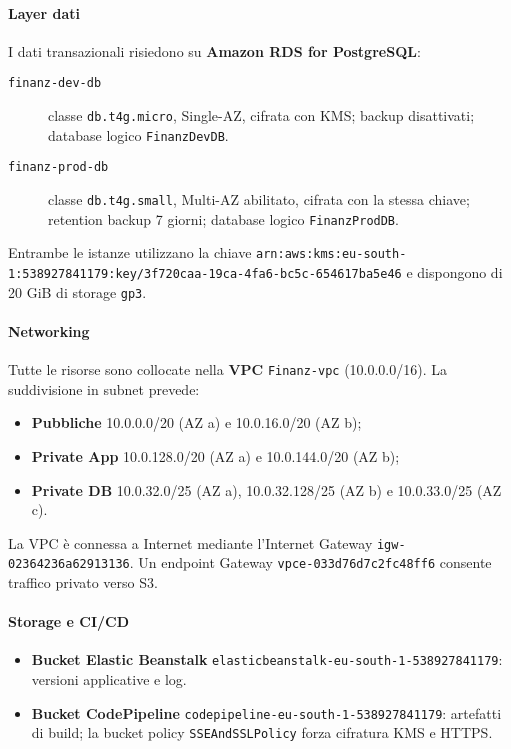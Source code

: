 \paragraph{Layer dati}
I dati transazionali risiedono su \textbf{Amazon RDS for PostgreSQL}:
\begin{description}
  \item[\texttt{finanz-dev-db}] classe \texttt{db.t4g.micro}, Single-AZ, cifrata con KMS; backup disattivati; database logico \texttt{FinanzDevDB}.
  \item[\texttt{finanz-prod-db}] classe \texttt{db.t4g.small}, Multi-AZ abilitato, cifrata con la stessa chiave; retention backup 7 giorni; database logico \texttt{FinanzProdDB}.
\end{description}
Entrambe le istanze utilizzano la chiave  
\texttt{arn:aws:kms:eu-south-1:538927841179:key/3f720caa-19ca-4fa6-bc5c-654617ba5e46}  
e dispongono di 20 GiB di storage \texttt{gp3}.

\paragraph{Networking}
Tutte le risorse sono collocate nella \textbf{VPC} \texttt{Finanz-vpc} (10.0.0.0/16). La suddivisione in subnet prevede:  
\begin{itemize}
  \item \textbf{Pubbliche} 10.0.0.0/20 (AZ a) e 10.0.16.0/20 (AZ b);
  \item \textbf{Private App} 10.0.128.0/20 (AZ a) e 10.0.144.0/20 (AZ b);
  \item \textbf{Private DB} 10.0.32.0/25 (AZ a), 10.0.32.128/25 (AZ b) e 10.0.33.0/25 (AZ c).
\end{itemize}
La VPC è connessa a Internet mediante l’Internet Gateway \texttt{igw-02364236a62913136}. Un endpoint Gateway \texttt{vpce-033d76d7c2fc48ff6} consente traffico privato verso S3.

\paragraph{Storage e CI/CD}
\begin{itemize}
  \item \textbf{Bucket Elastic Beanstalk} \texttt{elasticbeanstalk-eu-south-1-538927841179}: versioni applicative e log.
  \item \textbf{Bucket CodePipeline} \texttt{codepipeline-eu-south-1-538927841179}: artefatti di build; la bucket policy \texttt{SSEAndSSLPolicy} forza cifratura KMS e HTTPS.
\end{itemize}

